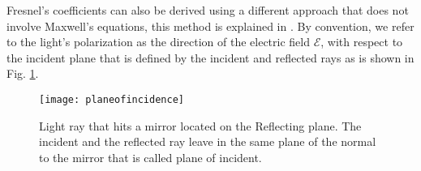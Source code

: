 Fresnel's coefficients can also be derived using a different approach that does not involve Maxwell's equations, this method is explained in \cite{feynman2011feynman}. 
By convention, we refer to the light's polarization as the direction of the electric field $\boldsymbol{\mathcal{E}}$, \cite{feynman1964feynman} with respect to the incident plane that is defined by the incident and reflected rays as is shown in Fig. \ref{fig:planeofincidence}. 
\begin{figure}[h]
 \label{fig:planeofincidence}
     \begin{center}
     \texttt{[image: planeofincidence]}
     \end{center}
     \caption{Light ray that hits a mirror located on the Reflecting plane. The incident and the reflected ray leave in the same plane of the normal to the mirror that is called plane of incident.}
\label{fig:planeofincidence}
 \end{figure}

